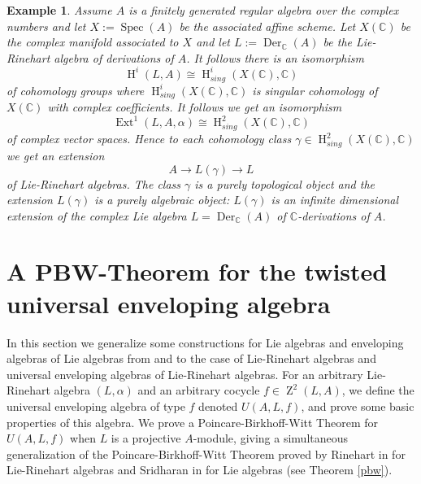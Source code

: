 \documentclass{amsart}
\theoremstyle{plain}
\newtheorem{example}[theorem]{Example}
\theoremstyle{definition}
\theoremstyle{remark}
\numberwithin{equation}{theorem}
\begin{document}
\begin{example} 

Assume $A$ is a finitely generated regular algebra over the complex numbers and let $X:={\operatorname{Spec} }(A)$ be the associated
affine scheme. Let $X({\mathbb{C} })$ be the complex manifold associated to $X$ and let $L:={\operatorname{Der} }_{\mathbb{C} }(A)$ be the Lie-Rinehart
algebra of derivations of $A$. It follows there is an isomorphism
\[ {\operatorname{H} }^i(L,A)\cong {\operatorname{H} }^i_{sing}(X({\mathbb{C} }), {\mathbb{C} }) \]
of cohomology groups where ${\operatorname{H} }^i_{sing}(X({\mathbb{C} }),{\mathbb{C} })$ is singular cohomology of $X({\mathbb{C} })$ with complex coefficients.
It follows we get an isomorphism
\[ {\operatorname{Ext} }^1(L, A, \alpha) \cong {\operatorname{H} }^2_{sing}(X({\mathbb{C} }),{\mathbb{C} }) \]
of complex vector spaces.
Hence to each cohomology class $\gamma \in {\operatorname{H} }^2_{sing}(X({\mathbb{C} }),{\mathbb{C} })$  we get an extension
\[ A \rightarrow L(\gamma) \rightarrow L \]
of Lie-Rinehart algebras. The class $\gamma$ is a purely topological object and the extension $L(\gamma)$ is a
purely algebraic object: $L(\gamma)$ is an infinite dimensional extension of the complex Lie algebra $L={\operatorname{Der} }_{\mathbb{C} }(A)$
of ${\mathbb{C} }$-derivations of $A$.
\end{example}

\section{A PBW-Theorem for the twisted universal enveloping algebra}

In this section we generalize some constructions for Lie algebras and enveloping algebras of Lie algebras
from \cite{rinehart} and \cite{sridharan}  
to the case of Lie-Rinehart algebras and universal enveloping algebras of Lie-Rinehart algebras.
For an arbitrary Lie-Rinehart algebra $(L,\alpha)$ and an arbitrary cocycle $f\in {\operatorname{Z}}^2(L,{A})$, we define the 
universal enveloping algebra of type $f$ denoted $U({A},L,f)$, and prove some basic properties of this algebra.
We prove a Poincare-Birkhoff-Witt Theorem for $U({A},L,f)$ when $L$ is a projective ${A}$-module, giving a simultaneous 
generalization of the Poincare-Birkhoff-Witt Theorem proved by Rinehart in \cite{rinehart} for Lie-Rinehart algebras
and Sridharan in \cite{sridharan} for Lie algebras (see Theorem \ref{pbw}).
\end{document}
